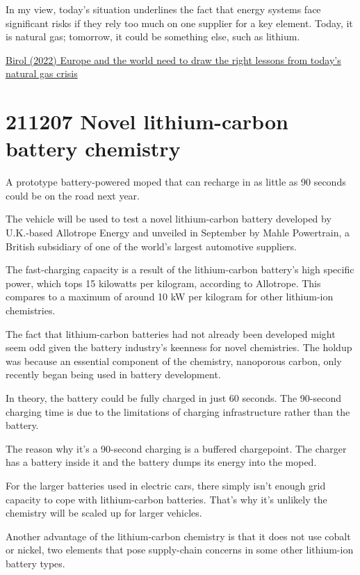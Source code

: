 \documentclass[
]{book}
\begin{document}
In my view, today's situation underlines the fact that energy systems face significant risks if they rely too much on one supplier for a key element. Today, it is natural gas; tomorrow, it could be something else, such as lithium.

\href{https://www.linkedin.com/pulse/europe-world-need-draw-right-lessons-from-todays-natural-fatih-birol/}{Birol (2022) Europe and the world need to draw the right lessons from today's natural gas crisis}

\hypertarget{novel-lithium-carbon-battery-chemistry}{%
\section{211207 Novel lithium-carbon battery chemistry}\label{novel-lithium-carbon-battery-chemistry}}

A prototype battery-powered moped that can recharge in as little as 90 seconds could be on the road next year.

The vehicle will be used to test a novel lithium-carbon battery developed by U.K.-based Allotrope Energy and unveiled in September by Mahle Powertrain, a British subsidiary of one of the world's largest automotive suppliers.

The fast-charging capacity is a result of the lithium-carbon battery's high specific power, which tops 15 kilowatts per kilogram, according to Allotrope. This compares to a maximum of around 10 kW per kilogram for other lithium-ion chemistries.

The fact that lithium-carbon batteries had not already been developed might seem odd given the battery industry's keenness for novel chemistries. The holdup was because an essential component of the chemistry, nanoporous carbon, only recently began being used in battery development.

In theory, the battery could be fully charged in just 60 seconds. The 90-second charging time is due to the limitations of charging infrastructure rather than the battery.

The reason why it's a 90-second charging is a buffered chargepoint. The charger has a battery inside it and the battery dumps its energy into the moped.

For the larger batteries used in electric cars, there simply isn't enough grid capacity to cope with lithium-carbon batteries. That's why it's unlikely the chemistry will be scaled up for larger vehicles.

Another advantage of the lithium-carbon chemistry is that it does not use cobalt or nickel, two elements that pose supply-chain concerns in some other lithium-ion battery types.
\end{document}
